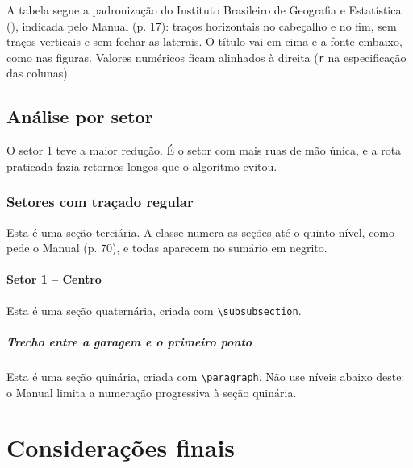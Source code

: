 \documentclass[diss,capa]{texufpel}
\begin{document}
A tabela segue a padronização do Instituto Brasileiro de Geografia e
Estatística (),
indicada pelo Manual (p. 17): traços
horizontais no cabeçalho e no fim, sem traços verticais e sem fechar as
laterais. O título vai em cima e a fonte embaixo, como nas figuras. Valores
numéricos ficam alinhados à direita (\texttt{r} na especificação das
colunas).

\section{Análise por setor}

O setor 1 teve a maior redução. É o setor com mais ruas de mão única, e a rota
praticada fazia retornos longos que o algoritmo evitou.

\subsection{Setores com traçado regular}

Esta é uma seção terciária. A classe numera as seções até o quinto nível,
como pede o Manual (p. 70), e todas aparecem no sumário em negrito.

\subsubsection{Setor 1 -- Centro}

Esta é uma seção quaternária, criada com \verb|\subsubsection|.

\paragraph{Trecho entre a garagem e o primeiro ponto}

Esta é uma seção quinária, criada com \verb|\paragraph|. Não use níveis abaixo
deste: o Manual limita a numeração progressiva à seção quinária.

\chapter{Considerações finais}
\label{cap:consideracoes}
\end{document}

